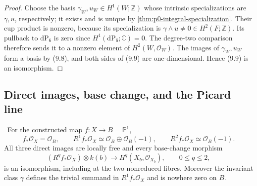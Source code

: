 \begin{proof}
Choose the basis \(\gamma_W,u_W\in H^1(W;\mathbb Z)\) whose intrinsic
specializations are \(\gamma,u\), respectively; it exists and is unique by
\cref{thm:p0-integral-specialization}.  Their cup product is nonzero,
because its specialization is
\(\gamma\wedge u\ne0\in H^2(F;\mathbb Z)\).  Its pullback to
\(\mathrm{dP}_6\) is zero since
\(H^1(\mathrm{dP}_6;\mathbb C)=0\).  The degree-two comparison therefore
sends it to a nonzero element of \(H^2(W,\mathcal O_W)\).  The images of
\(\gamma_W,u_W\) form a basis by (9.8), and both sides of (9.9) are
one-dimensional.  Hence (9.9) is an isomorphism.
\end{proof}

\subsection{Direct images, base change, and the Picard line}

\begin{theorem}
\label{thm:structure-direct-images-audit}
\Verified\ For the constructed map \(f:X\to B=\mathbb P^1\),
\[
 f_*\mathcal O_X=\mathcal O_B,\qquad
 R^1f_*\mathcal O_X\simeq
 \mathcal O_B\oplus\mathcal O_B(-1),\qquad
 R^2f_*\mathcal O_X\simeq\mathcal O_B(-1).
\tag{9.12}
\]
All three direct images are locally free and every base-change morphism
\[
 (R^qf_*\mathcal O_X)\otimes k(b)
 \longrightarrow H^q(X_b,\mathcal O_{X_b}),
 \qquad 0\le q\le2,
\tag{9.13}
\]
is an isomorphism, including at the two nonreduced fibres.  Moreover the
invariant class \(\gamma\) defines the trivial summand in
\(R^1f_*\mathcal O_X\) and is nowhere zero on \(B\).
\end{theorem}

